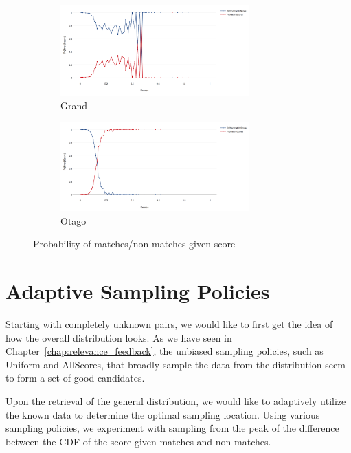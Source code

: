 \begin{figure}[htbp]
  \begin{subfigure}[t]{\textwidth}
    \centering
    \includegraphics[width=0.8\textwidth]{dataset/grand/pms}
    \caption{Grand}
    \label{fig:grand_pms} %
  \end{subfigure}
  \begin{subfigure}[t]{\textwidth}
    \centering
    \includegraphics[width=0.8\textwidth]{dataset/otago/pms}
    \caption{Otago}
    \label{fig:otago_pms} %
  \end{subfigure}
  \caption{Probability of matches/non-matches given score}
  \label{fig:pms} %
\end{figure}

\section{Adaptive Sampling Policies} %
\label{sec:sampling_policies}

Starting with completely unknown pairs, we would like to first get the idea
of how the overall distribution looks. As we have seen in
Chapter~\ref{chap:relevance_feedback}, the unbiased sampling policies, such as
Uniform and AllScores, that broadly sample the data from the distribution seem
to form a set of good candidates.

Upon the retrieval of the general distribution, we would like to adaptively
utilize the known data to determine the optimal sampling location. Using
various sampling policies, we experiment
with sampling from the peak of the difference between the CDF of the score
given matches and non-matches.

